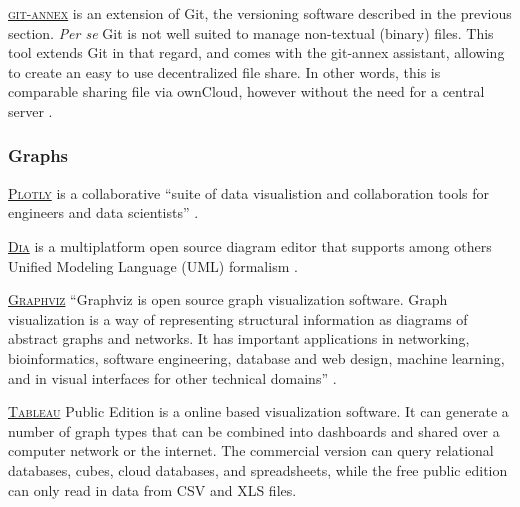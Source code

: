 \vspace{0.4cm}

\noindent {}  \textsc{\href{http://git-annex.branchable.com/}{git-annex}} is an extension of Git, the versioning software described in the previous section. \textit{Per se} Git is not well suited to manage non-textual (binary) files. This tool extends Git in that regard, and comes with the git-annex assistant, allowing to create an easy to use decentralized file share. In other words, this is comparable sharing file via ownCloud, however without the need for a central server \cite{git-annex_git-annex_2015}.

\subsubsection{Graphs}

\noindent {} \textsc{\href{https://plot.ly}{Plotly}} is a collaborative ``suite of data visualistion and collaboration tools for engineers and data scientists'' \cite{plot.ly_plotly_2015}.

\vspace{0.4cm}

\noindent {} \textsc{\href{https://wiki.gnome.org/Apps/Dia/}{Dia}} is a multiplatform open source diagram editor that supports among others Unified Modeling Language (UML) formalism \cite{gnu_dia_2015}.

\vspace{0.4cm}

\noindent {} \textsc{\href{http://www.graphviz.org/}{Graphviz}} ``Graphviz is open source graph visualization software. Graph visualization is a way of representing structural information as diagrams of abstract graphs and networks. It has important applications in networking, bioinformatics,  software engineering, database and web design, machine learning, and in visual interfaces for other technical domains'' \cite{graphviz_graph_2015}.

\vspace{0.4cm}

\noindent {} \textsc{\href{http://public.tableau.com}{Tableau}} Public Edition is a online based visualization software. It can generate a number of graph types that can be combined into dashboards and shared over a computer network or the internet. The commercial version can query relational databases, cubes, cloud databases, and spreadsheets, while the free public edition can only read in data from CSV and XLS files.

